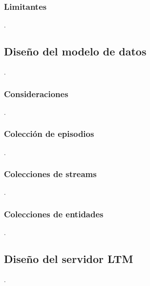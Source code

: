 \subsubsection{Limitantes}
 .


\subsection{Diseño del modelo de datos}
 .

\subsubsection{Consideraciones}
 .

\subsubsection{Colección de episodios}
 .

\subsubsection{Colecciones de streams}
 .

\subsubsection{Colecciones de entidades}

 .

\subsection{Diseño del servidor LTM}
 .

